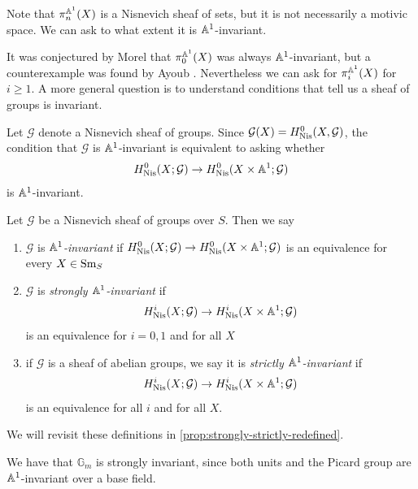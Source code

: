 \documentclass[11pt,openany]{book}
\begin{document}
Note that $\pi_n^{\mathbb{A}^1}(X)$ is a Nisnevich sheaf of sets, but it is not necessarily a motivic space. We can ask to what extent it is $\mathbb{A}^1$-invariant.

It was conjectured by Morel that $\pi_0^{\mathbb{A}^1}(X)$ was always $\mathbb{A}^1$-invariant, but a counterexample was found by Ayoub \cite{Ayoub-counterexamples}. Nevertheless we can ask for $\pi_i^{\mathbb{A}^1}(X)$ for $i\ge 1$. A more general question is to understand conditions that tell us a sheaf of groups is invariant.

Let $\mathcal{G}$ denote a Nisnevich sheaf of groups. Since $\mathcal{G}(X) = H^0_{\mathrm{Nis}}(X,\mathcal{G})$, the condition that $\mathcal{G}$ is $\mathbb{A}^1$-invariant is equivalent to asking whether
\begin{align*}
    H^0_{\mathrm{Nis}}(X; \mathcal{G}) \to H^0_{\mathrm{Nis}}(X \times \mathbb{A}^1 ; \mathcal{G})
\end{align*}
is $\mathbb{A}^1$-invariant.


\begin{definition}\label{def:strongly-strictly}
Let $\mathcal{G}$ be a Nisnevich sheaf of groups over $S$. Then we say
\begin{enumerate}
    \item $\mathcal{G}$ is $\mathbb{A}^1$\textit{-invariant} if $H^0_{\mathrm{Nis}}(X; \mathcal{G}) \to H^0_{\mathrm{Nis}}(X \times \mathbb{A}^1 ; \mathcal{G})$ is an equivalence for every $X\in \mathrm{Sm}_S$
    \item $\mathcal{G}$ is \textit{strongly $\mathbb{A}^1$-invariant} if
    \begin{align*}
        H^i_{\mathrm{Nis}}(X; \mathcal{G}) \to H^i_{\mathrm{Nis}}(X \times \mathbb{A}^1; \mathcal{G})
    \end{align*}
    is an equivalence for $i=0,1$ and for all $X$
    \item if $\mathcal{G}$ is a sheaf of abelian groups, we say it is \textit{strictly $\mathbb{A}^1$-invariant} if
    \begin{align*}
        H^i_{\mathrm{Nis}}(X; \mathcal{G}) \to H^i_{\mathrm{Nis}}(X \times \mathbb{A}^1; \mathcal{G})
    \end{align*}
    is an equivalence for all $i$ and for all $X$.
\end{enumerate}
We will revisit these definitions in \autoref{prop:strongly-strictly-redefined}.
\end{definition}


\begin{example} We have that $\mathbb{G}_m$ is strongly invariant, since both units and the Picard group are $\mathbb{A}^1$-invariant over a base field.
\end{example}
\end{document}
